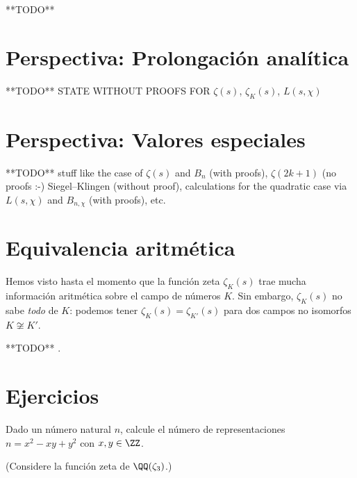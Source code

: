 **TODO**


\section{Perspectiva: Prolongación analítica}

**TODO** STATE WITHOUT PROOFS FOR $\zeta (s)$, $\zeta_K (s)$, $L (s,\chi)$


\section{Perspectiva: Valores especiales}

**TODO**
stuff like
the case of $\zeta (s)$ and $B_n$ (with proofs),
$\zeta (2k+1)$ (no proofs :-)
Siegel--Klingen (without proof),
calculations for the quadratic case via $L (s,\chi)$ and $B_{n,\chi}$ (with proofs),
etc.


\section{Equivalencia aritmética}

Hemos visto hasta el momento que la función zeta $\zeta_K (s)$ trae mucha
información aritmética sobre el campo de números $K$. Sin embargo, $\zeta_K (s)$
no sabe \emph{todo} de $K$: podemos tener $\zeta_K (s) = \zeta_{K'} (s)$ para
dos campos no isomorfos $K \not\cong K'$.

**TODO** \cite{Perlis-1977}.


\pagebreak


\section*{Ejercicios}

\begin{ejercicio}
  Dado un número natural $n$, calcule el número de representaciones
  $n = x^2 - xy + y^2$ con $x,y \in \ZZ$.

  \noindent (Considere la función zeta de $\QQ (\zeta_3)$.)
\end{ejercicio}

